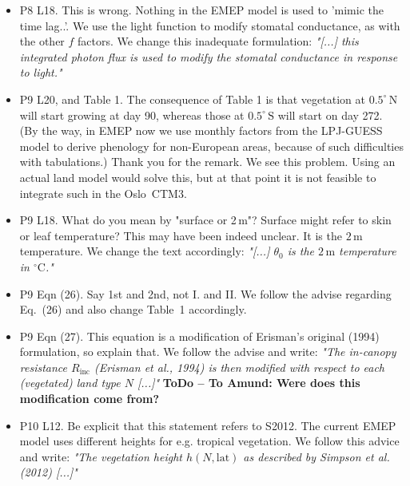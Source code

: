 \documentclass{scrartcl}
\begin{document}
\begin{itemize}
\item {\color{blue}P8 L18. This is wrong. Nothing in the EMEP model is used to ’mimic the
time lag..’. We use the light function to modify stomatal conductance, as with the
other $f$ factors.}
  We change this inadequate formulation: \emph{"[...] this integrated photon flux is used to modify the stomatal conductance in response to light."}
  
\item {\color{blue}P9 L20, and Table 1. The consequence of Table 1 is that vegetation at $0.5^\circ\,\mathrm{N}$
will start growing at day 90, whereas those at $0.5^\circ\,\mathrm{S}$ will start on day 272. (By the
way, in EMEP now we use monthly factors from the LPJ-GUESS model to derive
phenology for non-European areas, because of such difficulties with tabulations.)}
  Thank you for the remark. We see this problem. Using an actual land model would solve this, but at that point it is not feasible to integrate such in the Oslo~CTM3.
  
\item {\color{blue}P9 L18. What do you mean by "surface or 2\,m"? Surface might refer to skin or leaf temperature?}
  This may have been indeed unclear. It is the $\mathrm{2\,m}$ temperature. We change the text accordingly: \emph{"[...] $\theta_0$ is the $2\,\mathrm{m}$ temperature in $\mathrm{^\circ C}$."}
  
\item {\color{blue}P9 Eqn (26). Say 1st and 2nd, not I. and II.}
  We follow the advise regarding Eq.~(26) and also change Table~1 accordingly.
  
\item {\color{blue}P9 Eqn (27). This equation is a modification of Erisman’s original (1994) formulation, so explain that.}
  We follow the advise and write: \emph{"The in-canopy resistance $R_\text{inc}$ (Erisman et al., 1994) is then modified with respect to each (vegetated) land type $N$ [...]"} {\bfseries ToDo -- To Amund: Were does this modification come from?}
  
\item {\color{blue}P10 L12. Be explicit that this statement refers to S2012. The current EMEP
  model uses different heights for e.g. tropical vegetation.}
  We follow this advice and write: \emph{"The vegetation height $h(N, \text{lat})$ as described by Simpson et al. (2012) [...]"}
  

\end{itemize}
\end{document}
